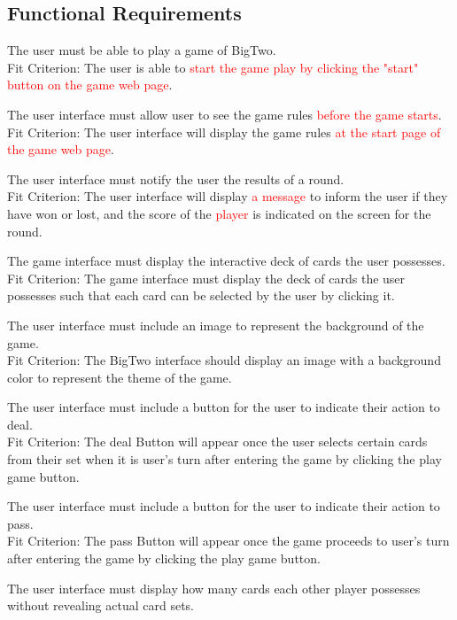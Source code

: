 \documentclass[12pt, titlepage]{article}
\begin{document}
\subsection{Functional Requirements}
\begin{FR}
\item The user must be able to play a game of BigTwo.\\
Fit Criterion: The user is able to \textcolor{red}{start the game play by clicking the "start" button on the game web page}.
\item The user interface must allow user to see the game rules \textcolor{red}{before the game starts}.\\
Fit Criterion: The user interface will display the game rules \textcolor{red}{at the start page of the game web page}.
\item The user interface must notify the user the results of a round.\\
Fit Criterion: The user interface will display \textcolor{red}{a message} to
inform the user if they have won or lost, and the score of the \textcolor{red}{player} is indicated on the screen for the round.
\item The game interface must display the interactive deck of cards the user possesses. \\
Fit Criterion: The game interface must display the deck of cards the user possesses such that each card can be selected by the user by clicking it.
\item The user interface must include an image to represent the background
of the game.\\
Fit Criterion: The BigTwo interface should display an image with a background color to
represent the theme of the game.
\item The user interface must include a button for the user to indicate their action to deal.\\
Fit Criterion: The deal Button will appear once the user selects certain cards from their set when it is user's turn after entering the game by clicking the play game button.
\item The user interface must include a button for the user to indicate their action to pass.\\
Fit Criterion: The pass Button will appear once the game proceeds to user's turn after entering the game by clicking the play game button.
\item The user interface must display how many cards each other player possesses without revealing actual card sets.\\

\end{FR}
\end{document}
